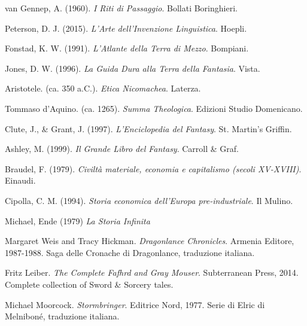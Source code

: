 van Gennep, A. (1960).
\textit{I Riti di Passaggio}.
Bollati Boringhieri.

Peterson, D. J. (2015).
\textit{L'Arte dell'Invenzione Linguistica}.
Hoepli.

Fonstad, K. W. (1991).
\textit{L'Atlante della Terra di Mezzo}.
Bompiani.

Jones, D. W. (1996).
\textit{La Guida Dura alla Terra della Fantasia}.
Vista.

Aristotele. (ca. 350 a.C.).
\textit{Etica Nicomachea}.
Laterza.

Tommaso d'Aquino. (ca. 1265).
\textit{Summa Theologica}.
Edizioni Studio Domenicano.

Clute, J., \& Grant, J. (1997).
\textit{L'Enciclopedia del Fantasy}.
St. Martin's Griffin.

Ashley, M. (1999).
\textit{Il Grande Libro del Fantasy}.
Carroll \& Graf.

Braudel, F. (1979).
\textit{Civiltà materiale, economia e capitalismo (secoli XV-XVIII)}.
Einaudi.

Cipolla, C. M. (1994).
\textit{Storia economica dell'Europa pre-industriale}.
Il Mulino.

Michael, Ende (1979)
\textit{La Storia Infinita}

Margaret Weis and Tracy Hickman.
\textit{Dragonlance Chronicles}.
Armenia Editore, 1987-1988.
Saga delle Cronache di Dragonlance, traduzione italiana.

Fritz Leiber.
\textit{The Complete Fafhrd and Gray Mouser}.
Subterranean Press, 2014.
Complete collection of Sword \& Sorcery tales.

Michael Moorcock.
\textit{Stormbringer}.
Editrice Nord, 1977.
Serie di Elric di Melniboné, traduzione italiana.

